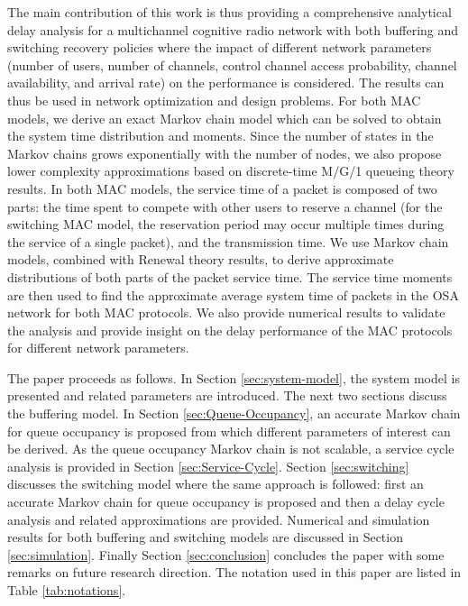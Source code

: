 \documentclass[12pt,journal,oneside,onecolumn]{IEEEtran}
\begin{document}
The main contribution of this work is thus providing a comprehensive analytical delay analysis for a multichannel cognitive radio network 
with both buffering and switching recovery policies where the impact of different network parameters 
(number of users, number of channels, control channel access probability, channel availability, and arrival rate) 
on the performance is considered. The results can thus be used in network optimization and design problems.  
For both MAC models, we derive an exact Markov chain model which can be solved to obtain the system time distribution and moments. Since the number of states in the Markov chains grows exponentially with the number of nodes, we also propose lower complexity approximations based on discrete-time M/G/1 queueing theory results. In both MAC models, the service time of a packet is composed of two parts: the time spent to compete with other users to reserve a channel (for the switching MAC model, the reservation period may occur multiple times during the service of a single packet), and the transmission time.  We use Markov chain models, combined with Renewal theory results, to derive approximate distributions of both parts of the packet service time. The service time moments are then used to find the approximate average system time of packets in the OSA network for both MAC protocols. We also provide numerical results to validate the analysis and provide insight on the delay performance of the MAC protocols for different network parameters.


The paper proceeds as follows.
In Section \ref{sec:system-model}, the system model is presented and related parameters are introduced. The next two sections discuss the buffering model. In Section \ref{sec:Queue-Occupancy}, an accurate Markov chain for queue occupancy is proposed from which different parameters of interest can be derived. As the queue occupancy Markov chain is not scalable, a service cycle analysis is provided in Section \ref{sec:Service-Cycle}. Section \ref{sec:switching} discusses the switching model where the same approach is followed: first an accurate Markov chain for queue occupancy is proposed and then a delay cycle analysis and related approximations are provided. Numerical and simulation results for both buffering and switching models are discussed in Section \ref{sec:simulation}. Finally Section \ref{sec:conclusion} concludes the paper with some remarks on future research direction. The notation used in this paper are listed in Table \ref{tab:notations}.
\end{document}
